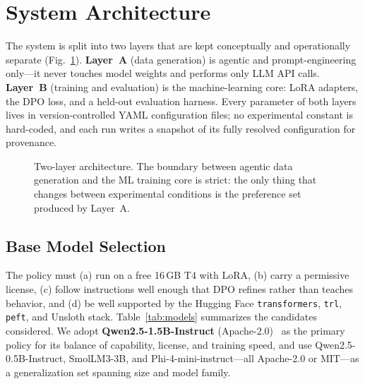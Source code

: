 \documentclass[conference]{IEEEtran}
\begin{document}
\section{System Architecture}
The system is split into two layers that are kept conceptually and operationally
separate (Fig.~\ref{fig:arch}). \textbf{Layer~A} (data generation) is agentic and
prompt-engineering only---it never touches model weights and performs only LLM API
calls. \textbf{Layer~B} (training and evaluation) is the machine-learning core:
LoRA adapters, the DPO loss, and a held-out evaluation harness. Every parameter of
both layers lives in version-controlled YAML configuration files; no experimental
constant is hard-coded, and each run writes a snapshot of its fully resolved
configuration for provenance.

\begin{figure}[t]
\centering
\setlength{\fboxsep}{6pt}
\caption{Two-layer architecture. The boundary between agentic data generation and
the ML training core is strict: the only thing that changes between experimental
conditions is the preference set produced by Layer~A.}
\label{fig:arch}
\end{figure}

\subsection{Base Model Selection}
The policy must (a) run on a free 16\,GB T4 with LoRA, (b) carry a permissive
license, (c) follow instructions well enough that DPO refines rather than teaches
behavior, and (d) be well supported by the Hugging Face \texttt{transformers},
\texttt{trl}, \texttt{peft}, and Unsloth stack. Table~\ref{tab:models} summarizes
the candidates considered. We adopt \textbf{Qwen2.5-1.5B-Instruct}
(Apache-2.0)~\cite{qwen25} as the primary policy for its balance of capability,
license, and training speed, and use Qwen2.5-0.5B-Instruct, SmolLM3-3B, and
Phi-4-mini-instruct---all Apache-2.0 or MIT---as a generalization set spanning
size and model family.
\end{document}
